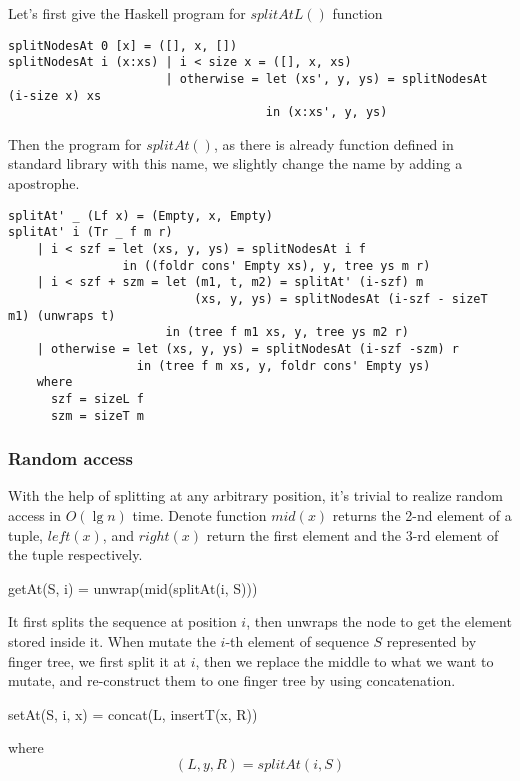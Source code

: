 \documentclass[UTF8]{article}
\begin{document}
Let's first give the Haskell program for $splitAtL()$ function

\lstset{language=Haskell}
\begin{lstlisting}
splitNodesAt 0 [x] = ([], x, [])
splitNodesAt i (x:xs) | i < size x = ([], x, xs)
                      | otherwise = let (xs', y, ys) = splitNodesAt (i-size x) xs
                                    in (x:xs', y, ys)
\end{lstlisting}

Then the program for $splitAt()$, as there is already function defined in standard
library with this name, we slightly change the name by adding a apostrophe.

\begin{lstlisting}
splitAt' _ (Lf x) = (Empty, x, Empty)
splitAt' i (Tr _ f m r)
    | i < szf = let (xs, y, ys) = splitNodesAt i f
                in ((foldr cons' Empty xs), y, tree ys m r)
    | i < szf + szm = let (m1, t, m2) = splitAt' (i-szf) m
                          (xs, y, ys) = splitNodesAt (i-szf - sizeT m1) (unwraps t)
                      in (tree f m1 xs, y, tree ys m2 r)
    | otherwise = let (xs, y, ys) = splitNodesAt (i-szf -szm) r
                  in (tree f m xs, y, foldr cons' Empty ys)
    where
      szf = sizeL f
      szm = sizeT m
\end{lstlisting}

\subsubsection{Random access}

With the help of splitting at any arbitrary position, it's trivial to realize random
access in $O(\lg n)$ time. Denote function $mid(x)$ returns the 2-nd element of a tuple,
$left(x)$, and $right(x)$ return the first element and the 3-rd element of the tuple
respectively.

\be
getAt(S, i) = unwrap(mid(splitAt(i, S)))
\ee

It first splits the sequence at position $i$, then unwraps the node to get the element
stored inside it. When mutate the $i$-th element of sequence $S$ represented by finger tree,
we first split it at $i$, then we replace the middle to what
we want to mutate, and re-construct them to one finger tree by using concatenation.

\be
setAt(S, i, x) = concat(L, insertT(x, R))
\ee

where
\[
(L, y, R) = splitAt(i, S)
\]
\end{document}
